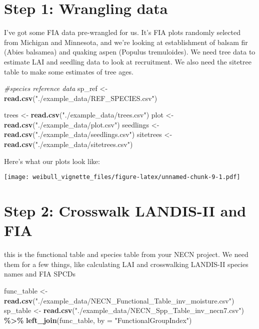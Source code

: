 \documentclass[
]{article}
\newenvironment{Shaded}{\begin{snugshade}}{\end{snugshade}}
\newcommand{\AttributeTok}[1]{\textcolor[rgb]{0.13,0.29,0.53}{#1}}
\newcommand{\CommentTok}[1]{\textcolor[rgb]{0.56,0.35,0.01}{\textit{#1}}}
\newcommand{\FunctionTok}[1]{\textcolor[rgb]{0.13,0.29,0.53}{\textbf{#1}}}
\newcommand{\NormalTok}[1]{#1}
\newcommand{\OtherTok}[1]{\textcolor[rgb]{0.56,0.35,0.01}{#1}}
\newcommand{\SpecialCharTok}[1]{\textcolor[rgb]{0.81,0.36,0.00}{\textbf{#1}}}
\newcommand{\StringTok}[1]{\textcolor[rgb]{0.31,0.60,0.02}{#1}}
\begin{document}
\section{Step 1: Wrangling data}\label{step-1-wrangling-data}

I've got some FIA data pre-wrangled for us. It's FIA plots randomly
selected from Michigan and Minnesota, and we're looking at establishment
of balsam fir (Abies balsamea) and quaking aspen (Populus tremuloides).
We need tree data to estimate LAI and seedling data to look at
recruitment. We also need the sitetree table to make some estimates of
tree ages.

\begin{Shaded}
\begin{Highlighting}[]
\CommentTok{\#species reference data}
\NormalTok{sp\_ref }\OtherTok{\textless{}{-}} \FunctionTok{read.csv}\NormalTok{(}\StringTok{"./example\_data/REF\_SPECIES.csv"}\NormalTok{)}

\NormalTok{trees }\OtherTok{\textless{}{-}} \FunctionTok{read.csv}\NormalTok{(}\StringTok{"./example\_data/trees.csv"}\NormalTok{)}
\NormalTok{plot }\OtherTok{\textless{}{-}} \FunctionTok{read.csv}\NormalTok{(}\StringTok{"./example\_data/plot.csv"}\NormalTok{)}
\NormalTok{seedlings }\OtherTok{\textless{}{-}} \FunctionTok{read.csv}\NormalTok{(}\StringTok{"./example\_data/seedlings.csv"}\NormalTok{)}
\NormalTok{sitetrees }\OtherTok{\textless{}{-}} \FunctionTok{read.csv}\NormalTok{(}\StringTok{"./example\_data/sitetrees.csv"}\NormalTok{)}
\end{Highlighting}
\end{Shaded}

Here's what our plots look like:

\texttt{[image: weibull\_vignette\_files/figure-latex/unnamed-chunk-9-1.pdf]}

\section{Step 2: Crosswalk LANDIS-II and
FIA}\label{step-2-crosswalk-landis-ii-and-fia}

this is the functional table and species table from your NECN project.
We need them for a few things, like calculating LAI and crosswalking
LANDIS-II species names and FIA SPCDs

\begin{Shaded}
\begin{Highlighting}[]
\NormalTok{func\_table }\OtherTok{\textless{}{-}} \FunctionTok{read.csv}\NormalTok{(}\StringTok{"./example\_data/NECN\_Functional\_Table\_inv\_moisture.csv"}\NormalTok{)}
\NormalTok{sp\_table }\OtherTok{\textless{}{-}} \FunctionTok{read.csv}\NormalTok{(}\StringTok{"./example\_data/NECN\_Spp\_Table\_inv\_necn7.csv"}\NormalTok{) }\SpecialCharTok{\%\textgreater{}\%}
  \FunctionTok{left\_join}\NormalTok{(func\_table, }\AttributeTok{by =} \StringTok{"FunctionalGroupIndex"}\NormalTok{) }
\end{Highlighting}
\end{Shaded}
\end{document}
